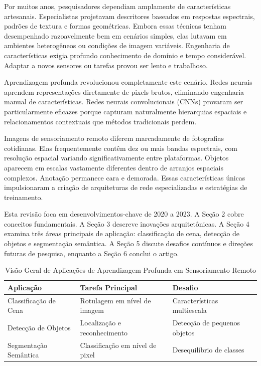 \documentclass[12pt,a4paper]{article}
\begin{document}
Por muitos anos, pesquisadores dependiam amplamente de características artesanais. Especialistas projetavam descritores baseados em respostas espectrais, padrões de textura e formas geométricas. Embora essas técnicas tenham desempenhado razoavelmente bem em cenários simples, elas lutavam em ambientes heterogêneos ou condições de imagem variáveis. Engenharia de características exigia profundo conhecimento de domínio e tempo considerável. Adaptar a novos sensores ou tarefas provou ser lento e trabalhoso.

Aprendizagem profunda revolucionou completamente este cenário. Redes neurais aprendem representações diretamente de pixels brutos, eliminando engenharia manual de características. Redes neurais convolucionais (CNNs) provaram ser particularmente eficazes porque capturam naturalmente hierarquias espaciais e relacionamentos contextuais que métodos tradicionais perdem.

Imagens de sensoriamento remoto diferem marcadamente de fotografias cotidianas. Elas frequentemente contêm dez ou mais bandas espectrais, com resolução espacial variando significativamente entre plataformas. Objetos aparecem em escalas vastamente diferentes dentro de arranjos espaciais complexos. Anotação permanece cara e demorada. Essas características únicas impulsionaram a criação de arquiteturas de rede especializadas e estratégias de treinamento.

Esta revisão foca em desenvolvimentos-chave de 2020 a 2023. A Seção 2 cobre conceitos fundamentais. A Seção 3 descreve inovações arquitetônicas. A Seção 4 examina três áreas principais de aplicação: classificação de cena, detecção de objetos e segmentação semântica. A Seção 5 discute desafios contínuos e direções futuras de pesquisa, enquanto a Seção 6 conclui o artigo.

\begin{table}[htbp]
\centering
\caption{Visão Geral de Aplicações de Aprendizagem Profunda em Sensoriamento Remoto}
\label{tab:applications}
\begin{tabular}{@{}lll@{}}
\toprule
\textbf{Aplicação} & \textbf{Tarefa Principal} & \textbf{Desafio} \\
\midrule
Classificação de Cena & Rotulagem em nível de imagem & Características multiescala \\
Detecção de Objetos & Localização e reconhecimento & Detecção de pequenos objetos \\
Segmentação Semântica & Classificação em nível de pixel & Desequilíbrio de classes \\
\bottomrule
\end{tabular}
\end{table}
\end{document}
